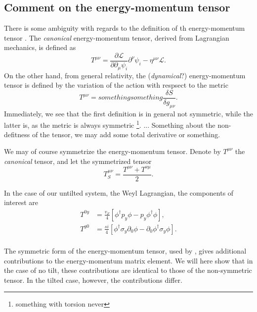 \subsection{Comment on the energy-momentum tensor}
There is some ambiguity with regards to the definition of th energy-momentum tensor .
The \emph{canonical} energy-momentum tensor, derived from Lagrangian mechanics, is defined as
\begin{equation}
	T^{\mu \nu } = \frac{\partial \mathcal{L}}{\partial \partial _{\mu } \psi_i } \partial ^{\nu } \psi_i - \eta^{\mu \nu } \mathcal{L}.
\end{equation}
On the other hand, from general relativity, the (\emph{dynamical}?) energy-momentum tensor is defined by the variation of the action with respsect to the metric
\begin{equation}
	T^{\mu \nu} = something something \frac{\delta S}{\delta g_{\mu \nu}}.
\end{equation}
Immediately, we see that the first definition is in general not symmetric, while the latter is, as the metric is always symmetric \footnote{something with torsion never}.
...
Something about the non-defitness of the tensor, we may add some total derivative or something.

We may of course symmetrize the energy-momentum tensor.
Denote by \( T^{\mu \nu } \) the \emph{canonical} tensor, and let the symmetrized tensor
\begin{equation}
  \label{eq:symstress}
  T_S^{\mu \nu} = \frac{T^{\mu \nu} + T^{\nu \mu}}{2}.
\end{equation}

In the case of our untilted system, the Weyl Lagrangian, the components of interest are
\begin{align}
  \label{eq:112}
  T^{0 y} &= \frac{v_F}{4}
  \left[
  \phi^{\dagger} p_y \phi - p_y \phi^{\dagger} \phi
  \right],\\
  T^{y 0} &= \frac{s i}{4}
  \left[
  \phi^{\dagger} \sigma_y \partial_{0} \phi - \partial_0 \phi^{\dagger} \sigma_y \phi
  \right].\\
\end{align}


The symmetric form of the energy-momentum tensor, used by \citeauthor{arjonaFingerprintsConformalAnomaly2019}, gives additional contributions to the energy-momentum matrix element.
We will here show that in the case of no tilt, these contributions are identical to those of the non-symmetric tensor.
In the tilted case, however, the contributions differ.

